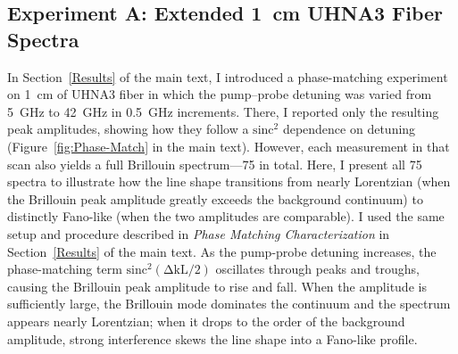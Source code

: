 \subsection{Experiment A: Extended \SI{1}{\centi\meter} UHNA3 Fiber Spectra}
\label{Appendix:Fano:Experiment A}

In Section~\ref{Results} of the main text, I introduced a phase-matching experiment on \SI{1}{\centi\meter} of UHNA3 fiber in which the pump--probe detuning was varied from \SI{5}{\giga\hertz} to \SI{42}{\giga\hertz} in \SI{0.5}{\giga\hertz} increments. There, I reported only the resulting peak amplitudes, showing how they follow a \(\mathrm{sinc^{2}}\) dependence on detuning (Figure~\ref{fig:Phase-Match} in the main text). However, each measurement in that scan also yields a full Brillouin spectrum—75 in total. Here, I present all 75 spectra to illustrate how the line shape transitions from nearly Lorentzian (when the Brillouin peak amplitude greatly exceeds the background continuum) to distinctly Fano-like (when the two amplitudes are comparable). I used the same setup and procedure described in \textit{Phase Matching Characterization} in Section~\ref{Results} of the main text. As the pump-probe detuning increases, the phase-matching term \(\mathrm{sinc^{2}(\Delta kL/2)}\) oscillates through peaks and troughs, causing the Brillouin peak amplitude to rise and fall. When the amplitude is sufficiently large, the Brillouin mode dominates the continuum and the spectrum appears nearly Lorentzian; when it drops to the order of the background amplitude, strong interference skews the line shape into a Fano-like profile.


